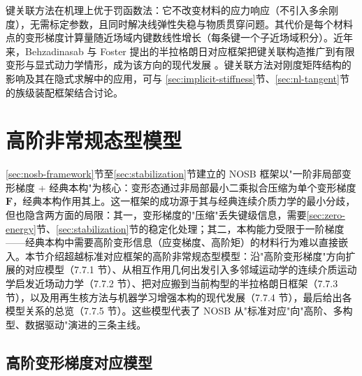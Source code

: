 \begin{remark}
  键关联方法在机理上优于罚函数法：它不改变材料的应力响应（不引入多余刚度），无需标定参数，且同时解决线弹性失稳与物质贯穿问题。其代价是每个材料点的变形梯度计算量随近场域内键数线性增长（每条键一个子近场域积分）。近年来，Behzadinasab 与 Foster 提出的半拉格朗日对应框架把键关联构造推广到有限变形与显式动力学情形，成为该方向的现代发展 \cite{BehzadinasabFoster2020}。键关联方法对刚度矩阵结构的影响及其在隐式求解中的应用，可与 \ref{sec:implicit-stiffness}节、\ref{sec:nl-tangent}节的族级装配框架结合讨论。
\end{remark}

\section{高阶非常规态型模型}\label{sec:higher-order}

\ref{sec:nosb-framework}节至\ref{sec:stabilization}节建立的 NOSB 框架以"一阶非局部变形梯度 + 经典本构"为核心：变形态通过非局部最小二乘拟合压缩为单个变形梯度 $\mathbf{F}$，经典本构作用其上。这一框架的成功源于其与经典连续介质力学的最小分歧，但也隐含两方面的局限：其一，变形梯度的"压缩"丢失键级信息，需要\ref{sec:zero-energy}节、\ref{sec:stabilization}节的稳定化处理；其二，本构能力受限于一阶梯度——经典本构中需要高阶变形信息（应变梯度、高阶矩）的材料行为难以直接嵌入。本节介绍超越标准对应框架的高阶非常规态型模型：沿"高阶变形梯度"方向扩展的对应模型（7.7.1 节）、从相互作用几何出发引入多邻域运动学的连续介质运动学启发近场动力学（7.7.2 节）、把对应搬到当前构型的半拉格朗日框架（7.7.3 节），以及用再生核方法与机器学习增强本构的现代发展（7.7.4 节），最后给出各模型关系的总览（7.7.5 节）。这些模型代表了 NOSB 从"标准对应"向"高阶、多构型、数据驱动"演进的三条主线。

\subsection{高阶变形梯度对应模型}\label{sec:higher-order-correspondence}

